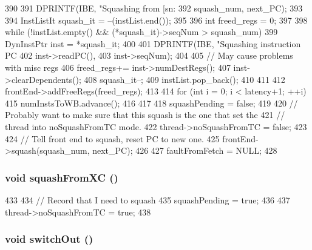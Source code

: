 \begin{DoxyCode}
390 {
391     DPRINTF(IBE, "Squashing from [sn:%
392             squash_num, next_PC);
393 
394     InstListIt squash_it = --(instList.end());
395 
396     int freed_regs = 0;
397 
398     while (!instList.empty() && (*squash_it)->seqNum > squash_num) {
399         DynInstPtr inst = *squash_it;
400 
401         DPRINTF(IBE, "Squashing instruction PC %
402                 inst->readPC(),
403                 inst->seqNum);
404 
405         // May cause problems with misc regs
406         freed_regs+= inst->numDestRegs();
407         inst->clearDependents();
408         squash_it--;
409         instList.pop_back();
410     }
411 
412     frontEnd->addFreeRegs(freed_regs);
413 
414     for (int i = 0; i < latency+1; ++i) {
415         numInstsToWB.advance();
416     }
417 
418     squashPending = false;
419 
420     // Probably want to make sure that this squash is the one that set the
421     // thread into noSquashFromTC mode.
422     thread->noSquashFromTC = false;
423 
424     // Tell front end to squash, reset PC to new one.
425     frontEnd->squash(squash_num, next_PC);
426 
427     faultFromFetch = NULL;
428 }
\end{DoxyCode}
\hypertarget{classInorderBackEnd_a647eb6c891733b0ef3d9233af7f15748}{
\subsubsection[{squashFromXC}]{\setlength{\rightskip}{0pt plus 5cm}void squashFromXC ()}}
\label{classInorderBackEnd_a647eb6c891733b0ef3d9233af7f15748}



\begin{DoxyCode}
433 {
434     // Record that I need to squash
435     squashPending = true;
436 
437     thread->noSquashFromTC = true;
438 }
\end{DoxyCode}
\hypertarget{classInorderBackEnd_a05f299b443f8cc73a93d61572edc0218}{
\subsubsection[{switchOut}]{\setlength{\rightskip}{0pt plus 5cm}void switchOut ()}}
\label{classInorderBackEnd_a05f299b443f8cc73a93d61572edc0218}



